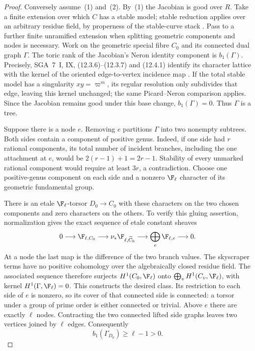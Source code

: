 \begin{proof}
Conversely assume~(1) and~(2). By~(1) the Jacobian is good over $R$.
Take a finite extension over which $C$ has a stable model; stable
reduction applies over an arbitrary residue field, by properness of
the stable-curve stack \citep[Theorem 2.7]{BC_Knudsen}.
Pass to a further finite unramified extension when splitting geometric
components and nodes is necessary. Work on the geometric special fibre
$C_0$ and its connected dual graph $\Gamma$.
The toric rank of the Jacobian's Neron identity component is
$b_1(\Gamma)$. Precisely, SGA~7~I, IX, (12.3.6)--(12.3.7) and
(12.4.1) identify its character lattice with the kernel of the
oriented edge-to-vertex incidence map \citep{BC_SGA7}.
If the total stable model has a singularity $xy=\varpi^m$, its
regular resolution only subdivides that edge, leaving this kernel
unchanged; the same Picard--Neron comparison applies. Since the
Jacobian remains good under this base change, $b_1(\Gamma)=0$.
Thus $\Gamma$ is a tree.

Suppose there is a node $e$. Removing $e$ partitions $\Gamma$ into
two nonempty subtrees. Both sides contain a component of positive
genus. Indeed, if one side had $r$ rational components, its total
number of incident branches, including the one attachment at $e$,
would be $2(r-1)+1=2r-1$. Stability of every unmarked rational
component would require at least $3r$, a contradiction.
Choose one positive-genus component on each side and a nonzero
$\F_\ell$ character of its geometric fundamental group.

There is an etale $\F_\ell$-torsor $D_0\to C_0$ with these
characters on the two chosen components and zero characters on the
others. To verify this gluing assertion, normalization gives the exact
sequence of etale constant sheaves
\[
 0\longrightarrow\F_{\ell,C_0}\longrightarrow
 \nu_*\F_{\ell,\widetilde C_0}\longrightarrow
 \bigoplus_e\F_{\ell,e}\longrightarrow0.
\]
At a node the last map is the difference of the two branch values.
The skyscraper terms have no positive cohomology over the algebraically
closed residue field. The associated sequence therefore surjects
$H^1(C_0,\F_\ell)$ onto
$\bigoplus_v H^1(C_v,\F_\ell)$, with kernel
$H^1(\Gamma,\F_\ell)=0$. This constructs the desired class.
Its restriction to each side of $e$ is nonzero, so its cover of that
connected side is connected: a torsor under a group of prime order
is either connected or trivial. Above $e$ there are exactly $\ell$
nodes. Contracting the two connected lifted side graphs leaves two
vertices joined by $\ell$ edges. Consequently
\[
                     b_1(\Gamma_{D_0})\ge\ell-1>0.
\tag{B.pdiv.1}
\]


\end{proof}
